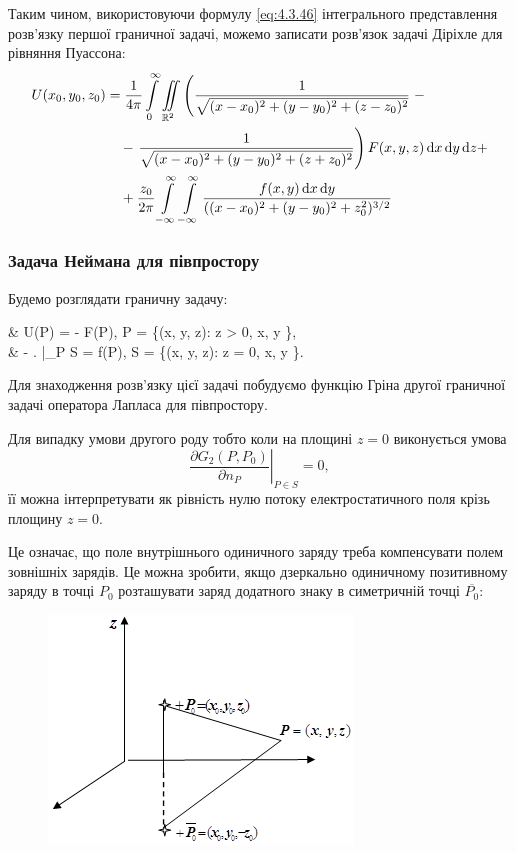 Таким чином, використовуючи формулу \eqref{eq:4.3.46} інтегрального представлення розв'язку першої граничної задачі, можемо записати розв'язок задачі Діріхле для рівняння Пуассона:
\begin{equation}
	\begin{aligned}
		U(x_0, y_0, z_0) &= \frac{1}{4 \pi} \displaystyle\int\limits_0^\infty \displaystyle\iint\limits_{\mathbb{R}^2} \left( \frac{1}{\sqrt{(x - x_0)^2 + (y - y_0)^2 + (z - z_0)^2}} \right. - \\
		& \quad - \left. \frac{1}{\sqrt{(x - x_0)^2 + (y - y_0)^2 + (z + z_0)^2}} \right) F(x, y, z) \mathop{}\!\mathrm{d} x \mathop{}\!\mathrm{d} y \mathop{}\!\mathrm{d} z + \\
		& \quad + \frac{z_0}{2 \pi} \displaystyle\int\limits_{-\infty}^\infty \displaystyle\int\limits_{-\infty}^\infty \frac{f(x, y) \mathop{}\!\mathrm{d} x \mathop{}\!\mathrm{d} y}{((x - x_0)^2 + (y - y_0)^2 + z_0^2)^{3/2}}
	\end{aligned}
\end{equation}

\subsubsection{Задача Неймана для півпростору}

Будемо розглядати граничну задачу:
\begin{system}
	& \Delta U(P) = - F(P), \quad P \in \Omega = \{(x, y, z): z > 0, x, y \in \RR\}, \\
	& - \left.  \right|_{P \in S} = f(P), \quad S = \{(x, y, z): z = 0, x, y \in \RR\}.
\end{system}

Для знаходження розв'язку цієї задачі побудуємо функцію Гріна другої граничної задачі оператора Лапласа для півпростору. \medskip

Для випадку умови другого роду тобто коли на площині $z = 0$ виконується умова
\begin{equation}
	\left. \frac{\partial G_2(P, P_0)}{\partial n_P} \right|_{P \in S} = 0,
\end{equation}
її можна інтерпретувати як рівність нулю потоку електростатичного поля крізь площину $z = 0$. \medskip

Це означає, що поле внутрішнього одиничного заряду треба компенсувати полем зовнішніх зарядів. Це можна зробити, якщо дзеркально одиничному позитивному заряду в точці $P_0$ розташувати заряд додатного знаку в симетричній точці $\overline{P_0}$:
\begin{figure}[H]
	\centering
	\includegraphics[]{../img/20-2.png}
\end{figure}

